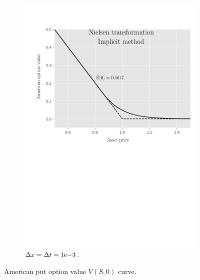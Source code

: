 \begin{figure}[tbp]
\begin{subfigure}{0.4\textwidth}
    \includegraphics[width=\textwidth]{chapters/chapter3/TestCase2NielsenImplicit.pdf}
    \caption{$\Delta{x}=\Delta{t}={1}\mathrm{e}{-3}$.}
  \end{subfigure}
  \caption{American put option value $V(S, 0)$ curve.}
  \label{fig:finitedifferencesschemes:numericaresults:test_case_2}
\end{figure}

